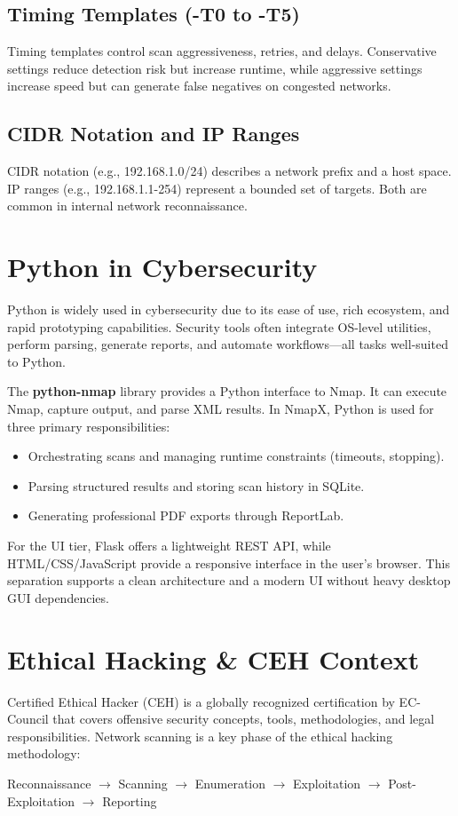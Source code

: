 \documentclass[12pt, a4paper]{report}
\newcommand{\NmapX}{NmapX}
\begin{document}
\subsection{Timing Templates (-T0 to -T5)}
Timing templates control scan aggressiveness, retries, and delays. Conservative settings reduce detection risk but increase runtime, while aggressive settings increase speed but can generate false negatives on congested networks.

\subsection{CIDR Notation and IP Ranges}
CIDR notation (e.g., 192.168.1.0/24) describes a network prefix and a host space. IP ranges (e.g., 192.168.1.1-254) represent a bounded set of targets. Both are common in internal network reconnaissance.

\section{Python in Cybersecurity}
Python is widely used in cybersecurity due to its ease of use, rich ecosystem, and rapid prototyping capabilities. Security tools often integrate OS-level utilities, perform parsing, generate reports, and automate workflows---all tasks well-suited to Python.

The \textbf{python-nmap} library provides a Python interface to Nmap. It can execute Nmap, capture output, and parse XML results. In \NmapX, Python is used for three primary responsibilities:
\begin{itemize}[leftmargin=2.2em]
  \item Orchestrating scans and managing runtime constraints (timeouts, stopping).
  \item Parsing structured results and storing scan history in SQLite.
  \item Generating professional PDF exports through ReportLab.
\end{itemize}

For the UI tier, Flask offers a lightweight REST API, while HTML/CSS/JavaScript provide a responsive interface in the user's browser. This separation supports a clean architecture and a modern UI without heavy desktop GUI dependencies.

\section{Ethical Hacking \& CEH Context}
Certified Ethical Hacker (CEH) is a globally recognized certification by EC-Council that covers offensive security concepts, tools, methodologies, and legal responsibilities. Network scanning is a key phase of the ethical hacking methodology:
\begin{center}
Reconnaissance $\rightarrow$ Scanning $\rightarrow$ Enumeration $\rightarrow$ Exploitation $\rightarrow$ Post-Exploitation $\rightarrow$ Reporting
\end{center}
\end{document}
